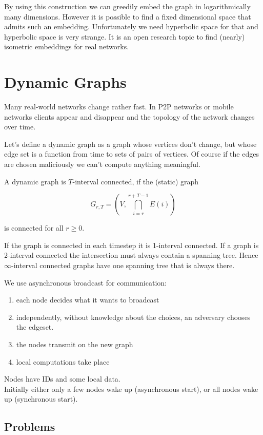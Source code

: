 By using this construction we can greedily embed the graph in logarithmically many dimensions. However it is possible to find a fixed dimensional space that admits such an embedding. Unfortunately we need hyperbolic space for that and hyperbolic space is very strange. It is an open research topic to find (nearly) isometric embeddings for real networks.

\section{Dynamic Graphs}

Many real-world networks change rather fast. In P2P networks or mobile networks clients appear and disappear and the topology of the network changes over time.

Let's define a dynamic graph as a graph whose vertices don't change, but whose edge set is a function from time to sets of pairs of vertices. Of course if the edges are chosen maliciously we can't compute anything meaningful.

\begin{Def} A dynamic graph is $T$-interval connected, if the (static) graph

\[G_{r,T} = (V, \bigcap_{i=r}^{r+T-1} E(i))\]

is connected for all $r\geq 0$.
\end{Def}

If the graph is connected in each timestep it is 1-interval connected. If a graph is 2-interval connected the intersection must always contain a spanning tree. Hence $\infty$-interval connected graphs have one spanning tree that is always there.

We use asynchronous broadcast for communication:
\begin{enumerate}
\item each node decides what it wants to broadcast
\item independently, without knowledge about the choices, an adversary chooses the edgeset.
\item the nodes transmit on the new graph
\item local computations take place
\end{enumerate}

Nodes have IDs and some local data. \\
Initially either only a few nodes wake up (asynchronous start), or all nodes wake up (synchronous start). 

\subsection{Problems}

